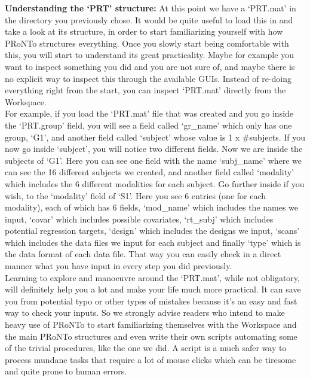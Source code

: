 \noindent \textbf{Understanding the `PRT' structure:} At this point we have a `PRT.mat' in the directory you previously chose. It would be quite useful to load this in \matlab{} and take a look at its structure, in order to start familiarizing yourself with how PRoNTo structures everything. Once you slowly start being comfortable with this, you will start to understand its great practicality. Maybe for example you want to inspect something you did and you are not sure of, and maybe there is no explicit way to inspect this through the available GUIs. Instead of re-doing everything right from the start, you can inspect `PRT.mat' directly from the \matlab{} Workspace.
\\

For example, if you load the `PRT.mat' file that was created and you go inside the `PRT.group' field, you will see a field called `gr\_name' which only has one group, `G1', and another field called `subject' whose value is 1 x \#subjects. If you now go inside `subject', you will notice two different fields. Now we are inside the subjects of `G1'. Here you can see one field with the name `subj\_name' where we can see the 16 different subjects we created, and another field called `modality' which includes the 6 different modalities for each subject. Go further inside if you wish, to the `modality' field of `S1'. Here you see 6 entries (one for each modality), each of which has 6 fields, `mod\_name' which includes the names we input, `covar' which includes possible covariates, `rt\_subj' which includes potential regression targets, `design' which includes the designs we input, `scans' which includes the data files we input for each subject and finally `type' which is the data format of each data file. That way you can easily check in a direct manner what you have input in every step you did previously.
\\

Learning to explore and manoeuvre around the `PRT.mat', while not obligatory, will definitely help you a lot and make your life much more practical. It can save you from potential typo or other types of mistakes because it's an easy and fast way to check your inputs. So we strongly advise readers who intend to make heavy use of PRoNTo to start familiarizing themselves with the \matlab{} Workspace and the main PRoNTo structures and even write their own \matlab{} scripts automating some of the trivial procedures, like the one we did. A \matlab{} script is a much safer way to process mundane tasks that require a lot of mouse clicks which can be tiresome and quite prone to human errors.
\\


